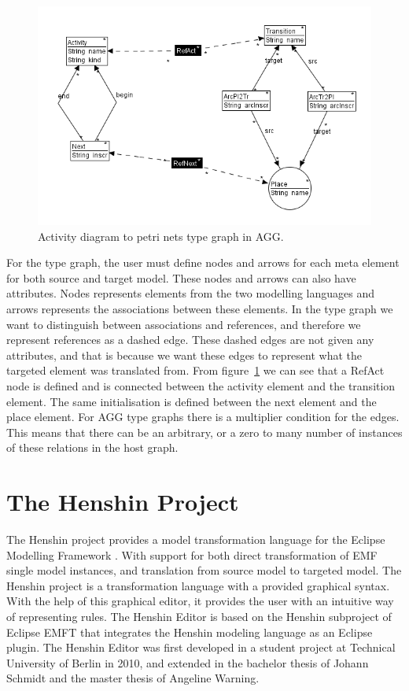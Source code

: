 \documentclass[pdftex,11pt,a4paper]{article}
\begin{document}
\begin{figure}[H]
	\centering
	\includegraphics[scale=0.7]{figures/AggTypeGraph.png}
	\caption{Activity diagram to petri nets type graph in AGG.}
	\label{fig:AggTypeGraph}
\end{figure}

\indent For the type graph, the user must define nodes and arrows for each meta
element for both source and target model. These nodes and arrows can also have
attributes. Nodes represents elements from the two modelling languages and
arrows represents the associations between these elements. In the type graph we
want to distinguish between associations and references, and therefore we
represent references as a dashed edge. These dashed edges are not given any
attributes, and that is because we want these edges to represent what the
targeted element was translated from. From figure~\ref{fig:AggTypeGraph} we can
see that a RefAct node is defined and is connected between the activity
element and the transition element. The same initialisation is defined between
the next element and the place element. For AGG type graphs there is a
multiplier condition for the edges. This means that there can be an arbitrary,
or a zero to many number of instances of these relations in the host graph.

\section{The Henshin Project}

\noindent The Henshin project\cite{Henshin} provides a model transformation
language for the Eclipse Modelling Framework \cite{Steinberg2009}. With support
for both direct transformation of EMF single model instances, and translation
from source model to targeted model. The Henshin project is a transformation
language with a provided graphical syntax. With the help of this graphical
editor, it provides the user with an intuitive way of representing rules. The
Henshin Editor is based on the Henshin subproject of Eclipse EMFT\cite{EMFT}
that integrates the Henshin modeling language as an Eclipse plugin. The Henshin
Editor was first developed in a student project at Technical University of
Berlin in 2010, and extended in the bachelor thesis of Johann Schmidt and the
master thesis of Angeline Warning.
\end{document}
